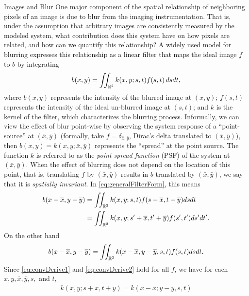 \begin{chapter}{Images and Blur}
  One major component of the spatial relationship of neighboring pixels of an image is due to blur from the imaging instrumentation.
  That is, under the assumption that arbitrary images are consistently measured by the modeled system, what contribution does this system have on how pixels are related, and how can we quantify this relationship?
  A widely used model for blurring \citep{hansen2010,jain1989,vogel2002,epstein2008} expresses this relationship as a linear filter that maps the ideal image $f$ to $b$ by integrating
\begin{equation}\label{eq:generalFilterForm}
  b(x,y) = \iint_{\mathbb R^2} k(x,y;s,t) f(s,t)\,dsdt,
\end{equation}
  where $b(x,y)$ represents the intensity of the blurred image at $(x,y)$; $f(s,t)$ represents the intensity of the ideal un-blurred image at $(s,t)$; and $k$ is the kernel of the filter, which characterizes the blurring process.
  Informally, we can view the effect of blur point-wise by observing the system response of a ``point-source'' at $(\bar x,\bar y)$ (formally, take $f = \delta_{\bar x,\bar y}$, Dirac's delta translated to $(\bar x,\bar y)$), then $b(x,y) = k(x,y;\bar x,\bar y)$ represents the ``spread'' at the point source.
  The function $k$ is referred to as the \emph{point spread function} (PSF) of the system at $(\bar x,\bar y)$.
  When the effect of blurring does not depend on the location of this point, that is, translating $f$ by $(\bar x, \bar y)$ results in $b$ translated by $(\bar x,\bar y)$, we say that it is \emph{spatially invariant}. 
  In \eqref{eq:generalFilterForm}, this means
\begin{align} 
  b(x-\overline x,y-\overline y) 
  &= \iint_{\mathbb R^2} k(x,y;s,t) f(s-\overline x,t - \overline y)dsdt \nonumber\\
  &= \iint_{\mathbb R^2} k(x,y;s'+\overline x,t'+\overline y) f(s',t')ds'dt'.\label{eq:convDerive1}
\end{align}
  On the other hand
\begin{equation} \label{eq:convDerive2}
  b(x-\overline x,y-\overline y) = \iint_{\mathbb R^2} k(x-\overline x,y-\overline y,s,t) f(s,t)dsdt. 
\end{equation}
  Since \eqref{eq:convDerive1} and \eqref{eq:convDerive2} hold for all $f$, we have for each $x,y,\bar x, \bar y,s,$ and $t$,
\begin{align} 
 k(x,y;s+\bar x,t+\bar y) = k(x-\bar x;y-\bar y,s,t) 
\end{align}

\end{chapter}
